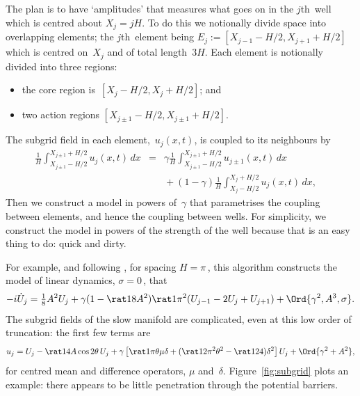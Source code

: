 \documentclass[12pt,a5paper]{article}
\begin{document}
The plan is to have `amplitudes' that measures what goes on in the \(j\)th~well which is centred about \(X_j=jH\).
To do this we notionally divide space into overlapping elements; the \(j\)th~element being \(E_j:=[X_{j-1}-H/2,X_{j+1}+H/2]\) which is centred on~\(X_j\) and of total length~\(3H\).
Each element is notionally divided into three regions:
\begin{itemize}
\item the core region is~\([X_j-H/2,X_j+H/2]\); and
\item two action regions \([X_{j\pm1}-H/2,X_{j\pm1}+H/2]\).
\end{itemize}
The subgrid field in each element,~\(u_j(x,t)\), is coupled to its neighbours by  
\begin{eqnarray}
\frac1H\int_{X_{j\pm1}-H/2}^{X_{j\pm1}+H/2}u_j(x,t)\,dx
&=&\gamma \frac1H\int_{X_{j\pm1}-H/2}^{X_{j\pm1}+H/2}u_{j\pm1}(x,t)\,dx
\nonumber\\&&{}
+(1-\gamma)\frac1H\int_{X_{j}-H/2}^{X_{j}+H/2}u_j(x,t)\,dx,
\quad\label{eq:cc}
\end{eqnarray}
Then we construct a model in powers of~\(\gamma\) that parametrises the coupling between elements, and hence the coupling between wells.
For simplicity, we construct the model in powers of the strength of the well because that is an easy thing to do: quick and dirty.


For example, and following \cite{Alfimov2002}, for spacing \(H=\pi\)\,, this algorithm constructs the model of linear dynamics, \(\sigma=0\)\,, that
\begin{equation}
-i\dot U_j=\tfrac18A^2U_j
+\gamma(1-\rat1{8}A^2)\rat1{\pi^2}(U_{j-1}-2U_j+U_{j+1})
+\Ord{\gamma^2,A^3,\sigma}.
\label{eq:igj}
\end{equation}
The subgrid fields of the slow manifold are complicated, even at this low order of truncation: the first few terms are
\begin{equation}
u_j = U_j -\rat14A\cos2\theta\,U_j
+\gamma\left[\rat1\pi\theta\mu\delta+(\rat1{2\pi^2}\theta^2-\rat1{24})\delta^2\right]U_j
+\Ord{\gamma^2+A^2},
\label{eq:uj}
\end{equation}
for centred mean and difference operators, \(\mu\) and~\(\delta\).
Figure~\ref{fig:subgrid} plots an example: 
there appears to be little penetration through the potential barriers.
\end{document}
